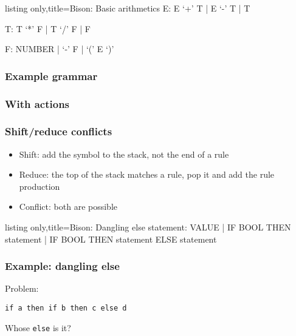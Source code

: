 \begin{lrbox}{\codebox}
  \begin{tcblisting}{listing only,title=Bison: Basic arithmetics}
E:
  E `+' T
| E `-' T
| T

T:
  T `*' F
| T `/' F
| F

F:
  NUMBER
| `-' F
| `(' E `)'
  \end{tcblisting}
\end{lrbox}
\begin{frame}
  \frametitle{Example grammar}
  \usebox{\codebox}
\end{frame}

\begin{lrbox}{\codebox}
\end{lrbox}
\begin{frame}
  \frametitle{With actions}
  \usebox{\codebox}
\end{frame}


\begin{frame}
  \frametitle{Shift/reduce conflicts}
  \begin{itemize}
    \item Shift: add the symbol to the stack, not the end of a rule
    \item Reduce: the top of the stack matches a rule, pop it and add the rule
    production
    \item Conflict: both are possible
  \end{itemize}
\end{frame}

\begin{lrbox}{\codebox}
  \begin{tcblisting}{listing only,title=Bison: Dangling else}
statement:
  VALUE
| IF BOOL THEN statement
| IF BOOL THEN statement ELSE statement
  \end{tcblisting}
\end{lrbox}
\begin{frame}[fragile]
  \frametitle{Example: dangling else}
  \usebox{\codebox}
  Problem:

  \texttt{if a then if b then c\only<2>{)} else d}

\bigskip
  Whose \texttt{else} is it?
\end{frame}


